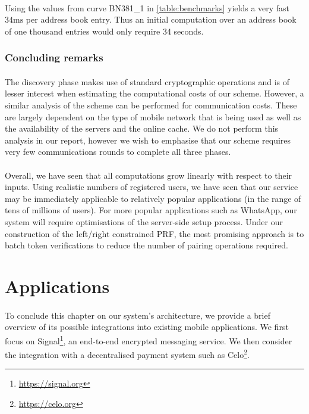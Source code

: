 	\paragraph{} Using the values from curve BN381\_1 in \autoref{table:benchmarks} yields  a very fast $34\mathrm{ms}$ per address book entry. Thus an initial computation over an address book of one thousand entries would only require 34 seconds.
	
	\subsubsection{Concluding remarks}
	
	\paragraph{} The discovery phase makes use of standard cryptographic operations and is of lesser interest when estimating the computational costs of our scheme. However, a similar analysis of the scheme can be performed for communication costs. These are largely dependent on the type of mobile network that is being used as well as the availability of the servers and the online cache. We do not perform this analysis in our report, however we wish to emphasise that our scheme requires very few communications rounds to complete all three phases.
	
	
	\paragraph{} Overall, we have seen that all computations grow linearly with respect to their inputs. Using realistic numbers of registered users, we have seen that our service may be immediately applicable to relatively popular applications (in the range of tens of millions of users). For more popular applications such as WhatsApp, our system will require optimisations of the server-side setup process. Under our construction of the left/right constrained PRF, the most promising approach is to batch token verifications to reduce the number of pairing operations required. 
	
 	


\section{Applications}
\label{sec:applications}

\paragraph{} To conclude this chapter on our system's architecture, we provide a brief overview of its possible integrations into existing mobile applications. We first focus on Signal\footnote{\url{https://signal.org}}, an end-to-end encrypted messaging service. We then consider the integration with a decentralised payment system such as Celo\footnote{\url{https://celo.org}}.

